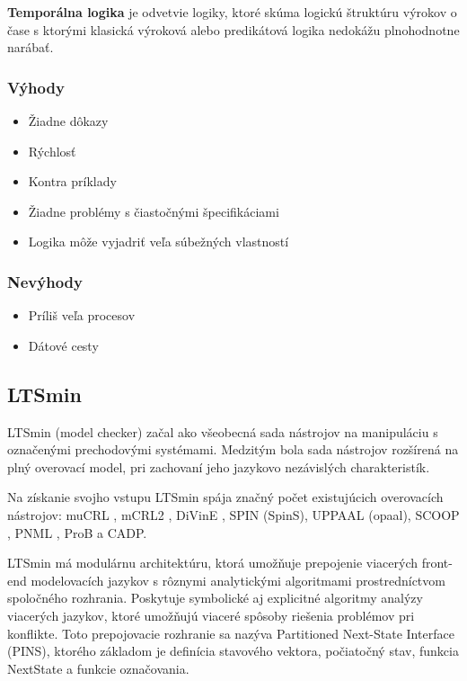 \textbf{Temporálna logika}  je odvetvie logiky, ktoré skúma logickú štruktúru výrokov 
o čase s ktorými klasická výroková alebo predikátová logika nedokážu plnohodnotne narábať.

\subsubsection{Výhody}

\begin{itemize}
	\item Žiadne dôkazy
	\item Rýchlosť
	\item Kontra príklady
	\item Žiadne problémy s čiastočnými špecifikáciami
	\item Logika môže vyjadriť veľa súbežných vlastností
\end{itemize}

\subsubsection{Nevýhody}

\begin{itemize}
	\item Príliš veľa procesov
	\item Dátové cesty
\end{itemize}

\subsection{LTSmin}
LTSmin (model checker) začal ako všeobecná sada nástrojov na manipuláciu s označenými prechodovými systémami. 
Medzitým bola sada nástrojov rozšírená na plný overovací model, 
pri zachovaní jeho jazykovo nezávislých charakteristík.

Na získanie svojho vstupu LTSmin spája značný počet existujúcich overovacích 
nástrojov: muCRL , mCRL2 , DiVinE , SPIN (SpinS), UPPAAL (opaal), SCOOP , PNML , ProB a CADP.

LTSmin má modulárnu architektúru, ktorá umožňuje prepojenie viacerých front-end modelovacích 
jazykov s rôznymi analytickými algoritmami prostredníctvom spoločného rozhrania.
Poskytuje symbolické aj explicitné algoritmy analýzy viacerých jazykov, 
ktoré umožňujú viaceré spôsoby riešenia problémov pri konflikte.
Toto prepojovacie rozhranie sa nazýva Partitioned Next-State Interface (PINS), 
ktorého základom je definícia stavového vektora, počiatočný stav, 
funkcia NextState a funkcie označovania.

